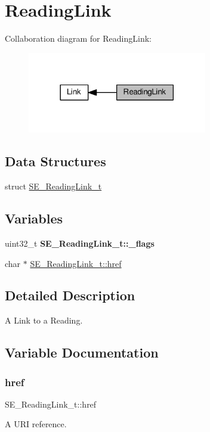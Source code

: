 \hypertarget{group__ReadingLink}{}\section{Reading\+Link}
\label{group__ReadingLink}
Collaboration diagram for Reading\+Link\+:\nopagebreak
\begin{figure}[H]
\begin{center}
\leavevmode
\includegraphics[width=222pt]{group__ReadingLink}
\end{center}
\end{figure}
\subsection*{Data Structures}
\begin{DoxyCompactItemize}
\item 
struct \hyperlink{structSE__ReadingLink__t}{S\+E\+\_\+\+Reading\+Link\+\_\+t}
\end{DoxyCompactItemize}
\subsection*{Variables}
\begin{DoxyCompactItemize}
\item 
\mbox{\label{group__ReadingLink_ga6b9caef8e331a95910faa8ae69b61b8d}} 
uint32\+\_\+t {\bfseries S\+E\+\_\+\+Reading\+Link\+\_\+t\+::\+\_\+flags}
\item 
char $\ast$ \hyperlink{group__ReadingLink_ga093e79012e3d23ed5d04d10beab9b49b}{S\+E\+\_\+\+Reading\+Link\+\_\+t\+::href}
\end{DoxyCompactItemize}


\subsection{Detailed Description}
A Link to a Reading. 

\subsection{Variable Documentation}
\mbox{\label{group__ReadingLink_ga093e79012e3d23ed5d04d10beab9b49b}} 
\subsubsection{\texorpdfstring{href}{href}}
{\footnotesize\ttfamily S\+E\+\_\+\+Reading\+Link\+\_\+t\+::href}

A U\+RI reference. 
